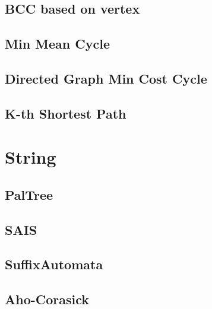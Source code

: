 \documentclass[a4paper,10pt,twocolumn,oneside]{article}
\begin{document}
\subsection{BCC based on vertex}


\subsection{Min Mean Cycle}


\subsection{Directed Graph Min Cost Cycle}


\subsection{K-th Shortest Path}


%


\section{String}
\subsection{PalTree}


%

\subsection{SAIS}


\subsection{SuffixAutomata}


\subsection{Aho-Corasick}

\end{document}
